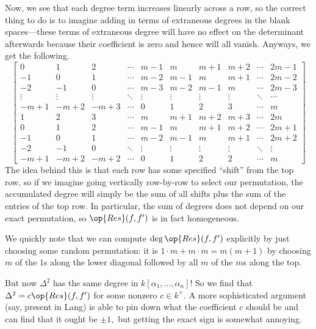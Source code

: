 Now, we see that each degree term increases linearly across a row, so the correct thing to do is to imagine adding in terms of extraneous degrees in the blank spaces---these terms of extraneous degree will have no effect on the determinant afterwards because their coefficient is zero and hence will all vanish. Anyways, we get the following.
\[\begin{bmatrix}
	0      & 1      & 2      & \cdots & m-1    & m      & m+1    & m+2    & \cdots & 2m-1   \\
	-1     & 0      & 1      & \cdots & m-2    & m-1    & m      & m+1    & \cdots & 2m-2   \\
	-2     & -1     & 0      & \cdots & m-3    & m-2    & m-1    & m      & \cdots & 2m-3   \\
	\vdots & \vdots & \vdots & \ddots & \vdots & \vdots & \vdots & \vdots & \ddots & \cdots \\
	-m+1   & -m+2   & -m+3   & \cdots & 0      & 1      & 2      & 3      & \cdots & m      \\
	1      & 2      & 3      & \cdots & m      & m+1    & m+2    & m+3    & \cdots & 2m     \\
	0      & 1      & 2      & \cdots & m-1    & m      & m+1    & m+2    & \cdots & 2m+1   \\
	-1     & 0      & 1      & \cdots & m-2    & m-1    & m      & m+1    & \cdots & 2m+2   \\
	-2     & -1     & 0      & \ddots & \vdots & \vdots & \vdots & \vdots & \ddots & \vdots \\
	-m+1   & -m+2   & -m+2   & \cdots & 0      & 1      & 2      & 2      & \cdots & m  
\end{bmatrix}\]
The idea behind this is that each row has some specified ``shift'' from the top row, so if we imagine going vertically row-by-row to select our permutation, the accumulated degree will simply be the sum of all shifts plus the sum of the entries of the top row. In particular, the sum of degrees does not depend on our exact permutation, so $\op{Res}(f,f')$ is in fact homogeneous.

We quickly note that we can compute $\deg\op{Res}(f,f')$ explicitly by just choosing some random permutation: it is $1\cdot m+m\cdot m=m(m+1)$ by choosing $m$ of the $1$s along the lower diagonal followed by all $m$ of the $m$s along the top.

But now $\Delta^2$ has the same degree in $k[\alpha_1,\ldots,\alpha_n]$! So we find that $\Delta^2=c\op{Res}(f,f')$ for some nonzero $c\in k^\times.$ A more sophisticated argument (say, present in Lang) is able to pin down what the coefficient $c$ should be and can find that it ought be $\pm1,$ but getting the exact sign is somewhat annoying.

